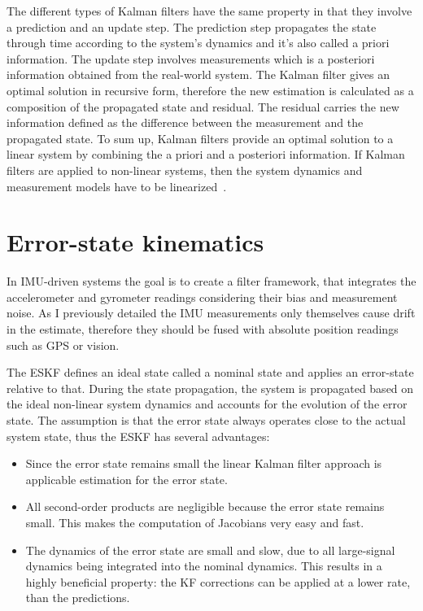 The different types of Kalman filters have the same property in that they involve a prediction and an update step. The prediction step propagates the state through time according to the system's dynamics and it's also called a priori information. The update step involves measurements which is a posteriori information obtained from the real-world system. The Kalman filter gives an optimal solution in recursive form, therefore the new estimation is calculated as a composition of the propagated state and residual. The residual carries the new information defined as the difference between the measurement and the propagated state. To sum up, Kalman filters provide an optimal solution to a linear system by combining the a priori and a posteriori information. If Kalman filters are applied to non-linear systems, then the system dynamics and measurement models have to be linearized~\cite{discrete_kalman_tutorial}.


\section{Error-state kinematics}

In IMU-driven systems the goal is to create a filter framework, that integrates the accelerometer and gyrometer readings considering their bias and measurement noise. As I previously detailed the IMU measurements only themselves cause drift in the estimate, therefore they should be fused with absolute position readings such as GPS or vision.

The ESKF defines an ideal state called a nominal state and applies an error-state relative to that. During the state propagation, the system is propagated based on the ideal non-linear system dynamics and accounts for the evolution of the error state. The assumption is that the error state always operates close to the actual system state, thus the ESKF has several advantages:
\begin{itemize}
    \item 
     Since the error state remains small the linear Kalman filter approach is applicable estimation for the error state.

    \item
    All second-order products are negligible because the error state remains small. This makes the computation of Jacobians very easy and fast. 

    \item 
    The dynamics of the error state are small and slow, due to all large-signal dynamics being integrated into the nominal dynamics. This results in a highly beneficial property: the KF corrections can be applied at a lower rate, than the predictions.
\end{itemize}

